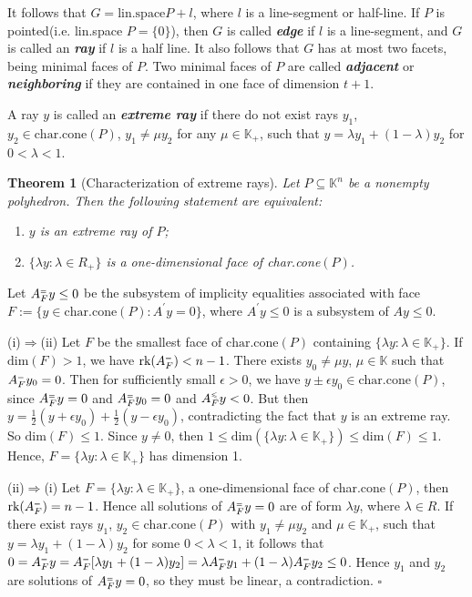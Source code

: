 \documentclass{article}
\newcounter{lecnum}
\newcommand{\tleq}{^{\mbox{\tiny $\leqslant$}}}
\newcommand{\teq}{^{\mbox{\tiny $=$}}}
\newtheorem{theorem}{Theorem}[lecnum]
\newenvironment{proof}{{\it Proof.}}{ \hfill $\square$}
\def\K{{\mathbb K}}
\begin{document}
It follows that $G=\mbox{lin.space} P +l$, where $l$ is a line-segment or half-line. If $P$ is pointed(i.e. lin.space $P=\{0\}$), then $G$ is called \emph{\textbf{edge}} if $l$ is a line-segment, and $G$ is called an \emph{\textbf{ray}} if $l$ is a half line. It also follows that $G$ has at most two facets, being minimal faces of $P$. Two minimal faces of $P$ are called \emph{\textbf{adjacent}} or \emph{\textbf{neighboring}} if they are contained in one face of dimension $t+1$.

A ray $y$ is called an \emph{\textbf{extreme ray}} if there do not exist rays $y_1$, $y_2\in\mbox{char.cone}(P)$, $y_1\not=\mu y_2$ for any $\mu\in\K_+$, such that $y=\lambda y_1+(1-\lambda)y_2$ for $0<\lambda<1$.

\begin{theorem}[Characterization of extreme rays] \hfill
Let $P\subseteq \K^n$ be a nonempty polyhedron. Then the following statement are equivalent:
\begin{enumerate}
  \item[\emph{(i)}] $y$ is an extreme ray of $P$;
  \item[\emph{(ii)}] $\{\lambda y: \lambda\in R_+\}$ is a one-dimensional face of char.cone$(P)$.
\end{enumerate}
\end{theorem}
\begin{proof}
Let $A_{F}\teq y\leq 0$ be the subsystem of implicity equalities associated with face $F:=\{y\in\mbox{char.cone}(P):A^\prime y=0\}$, where $A^\prime y\leq 0$ is a subsystem of $Ay\leq 0$.

 (i)$\Rightarrow$(ii)  Let $F$ be the smallest face of $\mbox{char.cone}(P)$ containing $\{\lambda y:\lambda\in\K_+\}$. If $\mbox{dim}(F)>1$, we have $\mbox{rk}(A_F\teq)<n-1$. There exists $y_0\not=\mu y$, $\mu\in\K$ such that $A_F\teq y_0=0$. Then for sufficiently small $\epsilon>0$, we have $y\pm \epsilon y_0\in \mbox{char.cone}(P)$, since $A_F\teq y=0$ and $A_F\teq y_0=0$ and $A_F\tleq y<0$. But then $y=\frac{1}{2}(y+\epsilon y_0)+\frac{1}{2}(y-\epsilon y_0)$, contradicting the fact that $y$ is an extreme ray. So $\mbox{dim}(F)\leq 1$. Since $y\not=0$, then $1\leq \mbox{dim}(\{\lambda y: \lambda\in\K_+\})\leq \mbox{dim}(F)\leq 1$. Hence, $F=\{\lambda y: \lambda\in\K_+\}$ has dimension 1.

(ii)$\Rightarrow$(i) Let $F=\{\lambda y:\lambda\in\K_+\}$, a one-dimensional face of char.cone$(P)$, then $\mbox{rk}(A_F\teq)=n-1$. Hence all solutions of $A_F\teq y=0$ are of form $\lambda y$, where $\lambda\in R$. If there exist rays $y_1$, $y_2\in\mbox{char.cone}(P)$ with $y_1\not=\mu y_2$ and $\mu\in\K_+$, such that $y=\lambda y_1+(1-\lambda)y_2$ for some $0<\lambda<1$, it follows that $0=A_F\teq y=A_F\teq[\lambda y_1+(1-\lambda)y_2]=\lambda A_F\teq y_1+(1-\lambda)A_F\teq y_2\leq 0$. Hence $y_1$ and $y_2$ are solutions of $A_F\teq y=0$, so they must be linear, a contradiction.
\end{proof}
\end{document}
